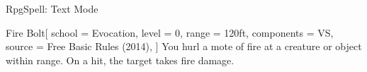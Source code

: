 \begin{ExampleBlock}{RpgSpell: Text Mode}
\begin{RpgSpell}{Fire Bolt}[
    school = Evocation,
    level = 0,
    range = 120ft,
    components = VS,
    source = Free Basic Rules (2014),
]
    You hurl a mote of fire at a creature or object within range. On a hit, the target takes  fire damage.

\end{RpgSpell}


\end{ExampleBlock}
